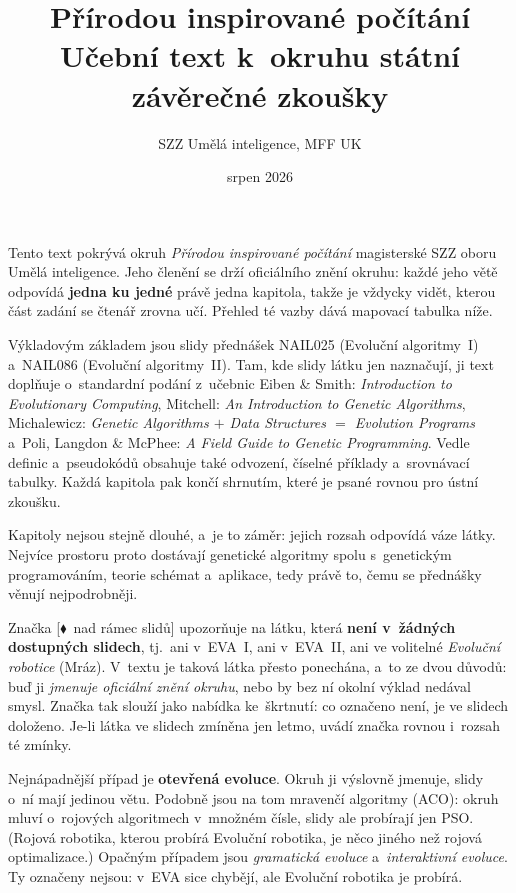 \documentclass[11pt,a4paper]{article}
\title{\textbf{Přírodou inspirované počítání}\\[2mm]
\large Učební text k~okruhu státní závěrečné zkoušky}
\author{SZZ Umělá inteligence, MFF UK}
\date{srpen 2026}
\theoremstyle{definition}
\newcommand{\mimo}{\textcolor{markcol}{\textsf{\footnotesize[$\blacklozenge$~nad rámec slidů]}}}
\begin{document}
\maketitle

\begin{center}
\begin{minipage}{0.92\textwidth}
\small
Tento text pokrývá okruh \emph{Přírodou inspirované počítání} magisterské SZZ oboru Umělá
inteligence. Jeho členění se drží oficiálního znění okruhu: každé jeho větě odpovídá
\textbf{jedna ku jedné} právě jedna kapitola, takže je vždycky vidět, kterou část zadání
se čtenář zrovna učí. Přehled té vazby dává mapovací tabulka níže.

Výkladovým základem jsou slidy přednášek NAIL025 (Evoluční algoritmy~I) a~NAIL086
(Evoluční algoritmy~II). Tam, kde slidy látku jen naznačují, ji text doplňuje o~standardní
podání z~učebnic Eiben \& Smith: \emph{Introduction to Evolutionary Computing}, Mitchell:
\emph{An Introduction to Genetic Algorithms}, Michalewicz: \emph{Genetic Algorithms $+$
Data Structures $=$ Evolution Programs} a~Poli, Langdon \& McPhee: \emph{A Field Guide to
Genetic Programming}. Vedle definic a~pseudokódů obsahuje také odvození, číselné příklady
a~srovnávací tabulky. Každá kapitola pak končí shrnutím, které je psané rovnou pro ústní
zkoušku.
\end{minipage}
\end{center}

\begin{center}
\begin{minipage}{0.92\textwidth}
\begin{poznbox}
\small
Kapitoly nejsou stejně dlouhé, a~je to záměr: jejich rozsah odpovídá váze látky. Nejvíce
prostoru proto dostávají genetické algoritmy spolu s~genetickým programováním, teorie
schémat a~aplikace, tedy právě to, čemu se přednášky věnují nejpodrobněji.

Značka \mimo{} upozorňuje na látku, která \textbf{není v~žádných dostupných slidech},
tj.\ ani v~EVA~I, ani v~EVA~II, ani ve volitelné \emph{Evoluční robotice} (Mráz).
V~textu je taková látka přesto ponechána, a~to ze dvou důvodů: buď ji \emph{jmenuje
oficiální znění okruhu}, nebo by bez ní okolní výklad nedával smysl. Značka tak slouží jako
nabídka ke~škrtnutí: co označeno není, je ve slidech doloženo. Je-li látka ve slidech
zmíněna jen letmo, uvádí značka rovnou i~rozsah té zmínky.

Nejnápadnější případ je \textbf{otevřená evoluce}. Okruh ji výslovně jmenuje, slidy o~ní
mají jedinou větu. Podobně jsou na tom mravenčí algoritmy (ACO): okruh mluví o~rojových
algoritmech v~množném čísle, slidy ale probírají jen PSO. (Rojová robotika, kterou probírá
Evoluční robotika, je něco jiného než rojová optimalizace.) Opačným případem jsou
\emph{gramatická evoluce} a~\emph{interaktivní evoluce}. Ty označeny nejsou: v~EVA sice
chybějí, ale Evoluční robotika je probírá.
\end{poznbox}
\end{minipage}
\end{center}
\end{document}
